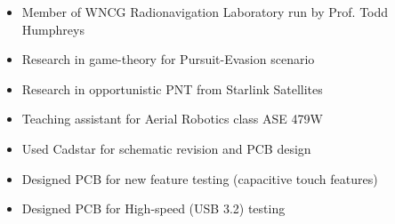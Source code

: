 \documentclass[11pt,a4paper,ragged2e,twocolumn]{altacv}
\begin{document}
\tagline{}


\twocolumn[
    \begin{@twocolumnfalse}
        \begin{center}

            \begin{fullwidth}
                \makecvheader
            \end{fullwidth}

        \end{center}
    \end{@twocolumnfalse}
]




\begin{itemize}
    \item Member of WNCG Radionavigation Laboratory run by Prof. Todd Humphreys \\
    \item Research in game-theory for Pursuit-Evasion scenario \\
    \item Research in opportunistic PNT from Starlink Satellites \\
    \item Teaching assistant for Aerial Robotics class ASE 479W \\
\end{itemize}

\divider

\begin{itemize}
    \item Used Cadstar for schematic revision and PCB design
    \item Designed PCB for new feature testing (capacitive touch features)
    \item Designed PCB for High-speed (USB 3.2) testing

\end{itemize}
\end{document}
